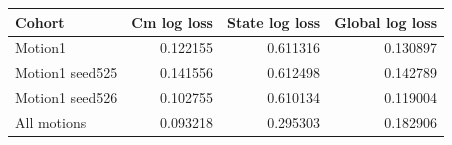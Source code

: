 \begin{tabular}{lrrr}
\toprule
Cohort & Cm log loss & State log loss & Global log loss\\
\midrule
Motion1 & 0.122155 & 0.611316 & 0.130897\\
Motion1 seed525 & 0.141556 & 0.612498 & 0.142789\\
Motion1 seed526 & 0.102755 & 0.610134 & 0.119004\\
All motions & 0.093218 & 0.295303 & 0.182906\\
\bottomrule
\end{tabular}
